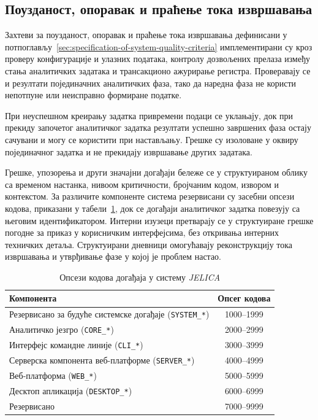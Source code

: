 \documentclass[12pt,oneside]{memoir}
\begin{document}
\subsection{Поузданост, опоравак и праћење тока извршавања}
Захтеви за поузданост, опоравак и праћење тока извршавања дефинисани у потпоглављу~\ref{sec:specification-of-system-quality-criteria} имплементирани су кроз проверу конфигурације и улазних података, контролу дозвољених прелаза између стања аналитичких задатака и трансакционо ажурирање регистра. Проверавају се и резултати појединачних аналитичких фаза, тако да наредна фаза не користи непотпуне или неисправно формиране податке.

При неуспешном креирању задатка привремени подаци се уклањају, док при прекиду започетог аналитичког задатка резултати успешно завршених фаза остају сачувани и могу се користити при настављању. Грешке су изоловане у оквиру појединачног задатка и не прекидају извршавање других задатака.

Грешке, упозорења и други значајни догађаји бележе се у структуираном облику са временом настанка, нивоом критичности, бројчаним кодом, извором и контекстом. За различите компоненте система резервисани су засебни опсези кодова, приказани у табели~\ref{tab:event-code-ranges}, док се догађаји аналитичког задатка повезују са његовим идентификатором. Интерни изузеци претварају се у структуиране грешке погодне за приказ у корисничким интерфејсима, без откривања интерних техничких детаља. Структуирани дневници омогућавају реконструкцију тока извршавања и утврђивање фазе у којој је проблем настао.

\begin{table}[htbp]
    \centering
    \caption{Опсези кодова догађаја у систему \textit{JELICA}}
    \label{tab:event-code-ranges}
    \begin{tabular}{|l|c|}
        \hline
        \textbf{Компонента} & \textbf{Опсег кодова} \\
        \hline
        Резервисано за будуће системске догађаје (\texttt{SYSTEM\_*}) & 1000--1999 \\
        \hline
        Аналитичко језгро (\texttt{CORE\_*}) & 2000--2999 \\
        \hline
        Интерфејс командне линије (\texttt{CLI\_*}) & 3000--3999 \\
        \hline
        Серверска компонента веб-платформе (\texttt{SERVER\_*}) & 4000--4999 \\
        \hline
        Веб-платформа (\texttt{WEB\_*}) & 5000--5999 \\
        \hline
        Десктоп апликација (\texttt{DESKTOP\_*}) & 6000--6999 \\
        \hline
        Резервисано & 7000--9999 \\
        \hline
    \end{tabular}
\end{table}
\end{document}
